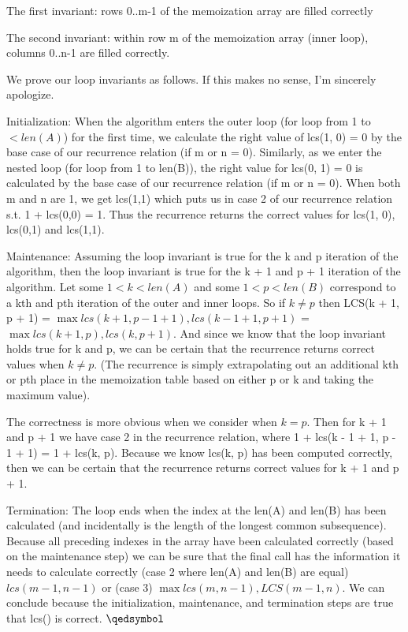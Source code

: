 \documentclass{article}
\begin{document}
The first invariant: rows 0..m-1 of the memoization array are filled correctly

The second invariant: within row m of the memoization array (inner loop), columns 0..n-1 are filled correctly. 

We prove our loop invariants as follows. If this makes no sense, I'm sincerely apologize. 

Initialization: When the algorithm enters the outer loop (for loop from 1 to $< len(A)$) for the first time, we calculate the right value of lcs(1, 0) = 0 by the base case of our recurrence relation (if m or n = 0). Similarly, as we enter the nested loop (for loop from 1 to len(B)), the right value for lcs(0, 1) = 0 is calculated by the base case of our recurrence relation (if m or n = 0). When both m and n are 1, we get lcs(1,1) which puts us in case 2 of our recurrence relation s.t. 1 + lcs(0,0) = 1. Thus the recurrence returns the correct values for lcs(1, 0), lcs(0,1) and lcs(1,1). 

Maintenance: Assuming the loop invariant is true for the k and p iteration of the algorithm, then the loop invariant is true for the k + 1 and p + 1 iteration of the algorithm. Let some $1 < k < len(A)$ and some $1 < p < len(B)$ correspond to a kth and pth iteration of the outer and inner loops. So if $k \neq p$ then LCS(k + 1, p + 1) = $\max{lcs(k + 1, p - 1 + 1), lcs(k - 1 + 1, p + 1)}$ =  $\max{lcs(k + 1, p), lcs(k, p + 1)}.$ And since we know that the loop invariant holds true for k and p, we can be certain that the recurrence returns correct values when $k \neq p$. (The recurrence is simply extrapolating out an additional kth or pth place in the memoization table based on either p or k and taking the maximum value).  

The correctness is more obvious when we consider when $k = p$. Then for k + 1 and p + 1 we have case 2 in the recurrence relation, where 1 + lcs(k - 1 + 1, p - 1 + 1) = 1 + lcs(k, p). Because we know lcs(k, p) has been computed correctly, then we can be certain that the recurrence returns correct values for k + 1 and p + 1.  

Termination: The loop ends when the index at the len(A) and len(B) has been calculated (and incidentally is the length of the longest common subsequence). Because all preceding indexes in the array have been calculated correctly (based on the maintenance step) we can be sure that the final call has the information it needs to calculate correctly (case 2 where len(A) and len(B) are equal) $lcs(m - 1, n - 1)$ or (case 3) $\max{lcs(m, n - 1), LCS(m - 1, n)}$. We can conclude because the initialization, maintenance, and termination steps are true that lcs() is correct. $\qedsymbol$
\end{document}

